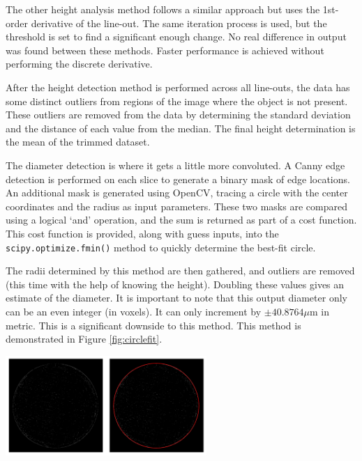 \documentclass[11pt, letterpaper, notitlepage]{article}
\newenvironment{Figure}
  {\par\medskip\noindent\minipage{\linewidth}}
  {\endminipage\par\medskip}
\begin{document}
\begin{multicols}{2}
The other height analysis method follows a similar approach but uses the 1st-order derivative of the line-out. The same iteration process is used, but the threshold is set to find a significant enough change. No real difference in output was found between these methods. Faster performance is achieved without performing the discrete derivative.

After the height detection method is performed across all line-outs, the data has some distinct outliers from regions of the image where the object is not present. These outliers are removed from the data by determining the standard deviation and the distance of each value from the median. The final height determination is the mean of the trimmed dataset.

The diameter detection is where it gets a little more convoluted. A Canny edge detection is performed on each slice to generate a binary mask of edge locations. An additional mask is generated using OpenCV, tracing a circle with the center coordinates and the radius as input parameters. These two masks are compared using a logical `and' operation, and the sum is returned as part of a cost function. This cost function is provided, along with guess inputs, into the \verb|scipy.optimize.fmin()| method to quickly determine the best-fit circle.

The radii determined by this method are then gathered, and outliers are removed (this time with the help of knowing the height). Doubling these values gives an estimate of the diameter. It is important to note that this output diameter only can be an even integer (in voxels). It can only increment by $\pm 40.8764 \mu$m in metric. This is a significant downside to this method. This method is demonstrated in Figure \ref{fig:circlefit}.

\begin{Figure}
  \centering
  \includegraphics[width=3in]{images/circle-fit.png}
  \label{fig:circlefit}
\end{Figure}


\end{multicols}
\end{document}

